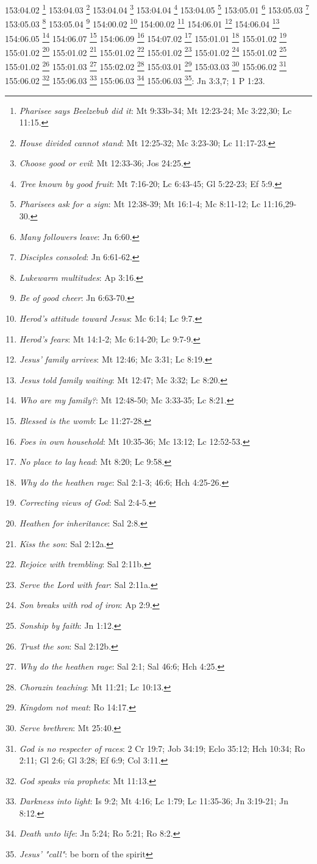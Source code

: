 {153:04.02 \footnote{\textit{Pharisee says Beelzebub did it}: Mt 9:33b-34; Mt 12:23-24; Mc 3:22,30; Lc 11:15.}
153:04.03 \footnote{\textit{House divided cannot stand}: Mt 12:25-32; Mc 3:23-30; Lc 11:17-23.}
153:04.04 \footnote{\textit{Choose good or evil}: Mt 12:33-36; Jos 24:25.}
153:04.04 \footnote{\textit{Tree known by good fruit}: Mt 7:16-20; Lc 6:43-45; Gl 5:22-23; Ef 5:9.}
153:04.05 \footnote{\textit{Pharisees ask for a sign}: Mt 12:38-39; Mt 16:1-4; Mc 8:11-12; Lc 11:16,29-30.}
153:05.01 \footnote{\textit{Many followers leave}: Jn 6:60.}
153:05.03 \footnote{\textit{Disciples consoled}: Jn 6:61-62.}
153:05.03 \footnote{\textit{Lukewarm multitudes}: Ap 3:16.}
153:05.04 \footnote{\textit{Be of good cheer}: Jn 6:63-70.}
154:00.02 \footnote{\textit{Herod's attitude toward Jesus}: Mc 6:14; Lc 9:7.}
154:00.02 \footnote{\textit{Herod's fears}: Mt 14:1-2; Mc 6:14-20; Lc 9:7-9.}
154:06.01 \footnote{\textit{Jesus' family arrives}: Mt 12:46; Mc 3:31; Lc 8:19.}
154:06.04 \footnote{\textit{Jesus told family waiting}: Mt 12:47; Mc 3:32; Lc 8:20.}
154:06.05 \footnote{\textit{Who are my family?}: Mt 12:48-50; Mc 3:33-35; Lc 8:21.}
154:06.07 \footnote{\textit{Blessed is the womb}: Lc 11:27-28.}
154:06.09 \footnote{\textit{Foes in own household}: Mt 10:35-36; Mc 13:12; Lc 12:52-53.}
154:07.02 \footnote{\textit{No place to lay head}: Mt 8:20; Lc 9:58.}
155:01.01 \footnote{\textit{Why do the heathen rage}: Sal 2:1-3; 46:6; Hch 4:25-26.}
155:01.02 \footnote{\textit{Correcting views of God}: Sal 2:4-5.}
155:01.02 \footnote{\textit{Heathen for inheritance}: Sal 2:8.}
155:01.02 \footnote{\textit{Kiss the son}: Sal 2:12a.}
155:01.02 \footnote{\textit{Rejoice with trembling}: Sal 2:11b.}
155:01.02 \footnote{\textit{Serve the Lord with fear}: Sal 2:11a.}
155:01.02 \footnote{\textit{Son breaks with rod of iron}: Ap 2:9.}
155:01.02 \footnote{\textit{Sonship by faith}: Jn 1:12.}
155:01.02 \footnote{\textit{Trust the son}: Sal 2:12b.}
155:01.03 \footnote{\textit{Why do the heathen rage}: Sal 2:1; Sal 46:6; Hch 4:25.}
155:02.02 \footnote{\textit{Chorazin teaching}: Mt 11:21; Lc 10:13.}
155:03.01 \footnote{\textit{Kingdom not meat}: Ro 14:17.}
155:03.03 \footnote{\textit{Serve brethren}: Mt 25:40.}
155:06.02 \footnote{\textit{God is no respecter of races}: 2 Cr 19:7; Job 34:19; Eclo 35:12; Hch 10:34; Ro 2:11; Gl 2:6; Gl 3:28; Ef 6:9; Col 3:11.}
155:06.02 \footnote{\textit{God speaks via prophets}: Mt 11:13.}
155:06.03 \footnote{\textit{Darkness into light}: Is 9:2; Mt 4:16; Lc 1:79; Lc 11:35-36; Jn 3:19-21; Jn 8:12.}
155:06.03 \footnote{\textit{Death unto life}: Jn 5:24; Ro 5:21; Ro 8:2.}
155:06.03 \footnote{\textit{Jesus' "call"}: be born of the spirit}: Jn 3:3,7; 1 P 1:23.}
